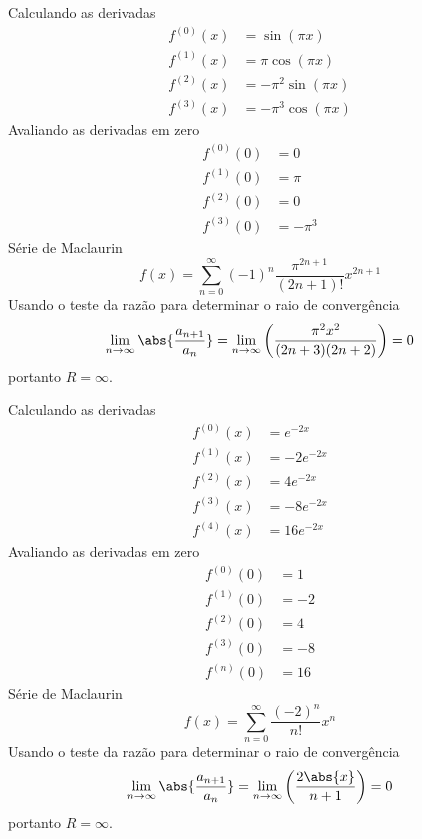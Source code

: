 \begin{exercises}
\begin{exercise}
\begin{answer}
\begin{alphalist}
  \item Calculando as derivadas
  \begin{align*}
  	f^{(0)}(x) & =        \sin(\pi x) \\
  	f^{(1)}(x) & =  \pi   \cos(\pi x) \\
  	f^{(2)}(x) & = -\pi^2 \sin(\pi x) \\
  	f^{(3)}(x) & = -\pi^3 \cos(\pi x)
  \end{align*}
  Avaliando as derivadas em zero
  \begin{align*}
  	f^{(0)}(0) & = 0      \\
  	f^{(1)}(0) & = \pi    \\
  	f^{(2)}(0) & = 0      \\
  	f^{(3)}(0) & = -\pi^3
  \end{align*}
  Série de Maclaurin
  \[
    f(x) = \sum_{n=0}^\infty (-1)^n \frac{\pi^{2n+1}}{(2n+1)!} x^{2n+1}
  \]
  Usando o teste da razão para determinar o raio de convergência
  \[
    \lim_{n\to\infty}\abs{\frac{a_{n+1}}{a_n}} =
    \lim_{n\to\infty}\left(\frac{\pi^2x^2}{(2n+3)(2n+2)}\right) = 0
  \]
  portanto $R=\infty$.

  \item Calculando as derivadas
  \begin{align*}
  	f^{(0)}(x) & =    e^{-2x} \\
  	f^{(1)}(x) & = -2 e^{-2x} \\
  	f^{(2)}(x) & =  4 e^{-2x} \\
  	f^{(3)}(x) & = -8 e^{-2x} \\
  	f^{(4)}(x) & = 16 e^{-2x}
  \end{align*}
  Avaliando as derivadas em zero
  \begin{align*}
  	f^{(0)}(0) & =  1 \\
  	f^{(1)}(0) & = -2 \\
  	f^{(2)}(0) & =  4 \\
  	f^{(3)}(0) & = -8 \\
  	f^{(n)}(0) & = 16
  \end{align*}
  Série de Maclaurin
  \[
    f(x) = \sum_{n=0}^\infty \frac{(-2)^n}{n!} x^n
  \]
  Usando o teste da razão para determinar o raio de convergência
  \[
    \lim_{n\to\infty}\abs{\frac{a_{n+1}}{a_n}} =
    \lim_{n\to\infty}\left(\frac{2\abs{x}}{n+1}\right) = 0
  \]
  portanto $R=\infty$.


\end{alphalist}
\end{answer}
\end{exercise}
\end{exercises}
